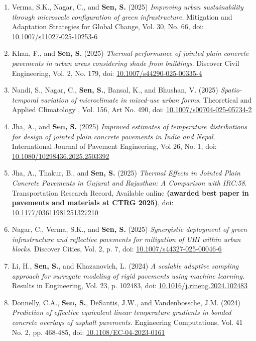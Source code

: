 \documentclass[12pt]{article}
\begin{document}
\begin{enumerate}
	\item Verma, S.K., Nagar, C., and \textbf{Sen, S.} (2025) \textit{Improving urban sustainability through microscale configuration of green infrastructure.} Mitigation and Adaptation Strategies for Global Change, Vol. 30, No. 66, doi: \href{https://doi.org/10.1007/s11027-025-10253-6}{10.1007/s11027-025-10253-6}
	\item Khan, F., and \textbf{Sen, S.} (2025) \textit{Thermal performance of jointed plain concrete pavements in urban areas considering shade from buildings}. Discover Civil Engineering, Vol. 2, No. 179, doi: \href{https://doi.org/10.1007/s44290-025-00335-4}{10.1007/s44290-025-00335-4}
	\item Nandi, S., Nagar, C., \textbf{Sen, S.}, Bansal, K., and Bhushan, V. (2025) \textit{Spatio-temporal variation of microclimate in mixed-use urban forms.} Theoretical and Applied Climatology , Vol. 156, Art No. 490,  doi: \href{https://doi.org/10.1007/s00704-025-05734-2}{10.1007/s00704-025-05734-2}
	\item Jha, A., and \textbf{Sen, S.} (2025) \textit{Improved estimates of temperature distributions for design of jointed plain concrete pavements in India and Nepal}. International Journal of Pavement Engineering, Vol 26, No. 1, doi: \href{https://doi.org/10.1080/10298436.2025.2503392}{10.1080/10298436.2025.2503392}
	\item Jha, A., Thakur, B., and \textbf{Sen, S.} (2025) \textit{Thermal Effects in Jointed Plain Concrete Pavements in Gujarat and Rajasthan: A Comparison with IRC:58}. Transportation Research Record, Available online \textbf{(awarded best paper in pavements and materials at CTRG 2025)}, doi: \href{https://doi.org/10.1177/03611981251327210}{10.1177/03611981251327210}
	\item Nagar, C., Verma, S.K., and \textbf{Sen, S.} (2025) \textit{Synergistic deployment of green infrastructure and reflective pavements for mitigation of UHI within urban blocks.} Discover Cities, Vol. 2, p. 7, doi: \href{https://doi.org/10.1007/s44327-025-00046-6}{10.1007/s44327-025-00046-6}
	\item Li, H., \textbf{Sen, S.}, and Khazanovich, L. (2024) \textit{A scalable adaptive sampling approach for surrogate modeling of rigid pavements using machine learning.} Results in Engineering, Vol. 23, p. 102483, doi: \href{https://doi.org/10.1016/j.rineng.2024.102483}{10.1016/j.rineng.2024.102483}
	\item Donnelly, C.A., \textbf{Sen, S.}, DeSantis, J.W., and Vandenbossche, J.M. (2024) \textit{Prediction of effective equivalent linear temperature gradients in bonded concrete overlays of asphalt pavements.}  Engineering Computations, Vol. 41 No. 2, pp. 468-485, doi: \href{https://doi.org/10.1108/EC-04-2023-0161}{10.1108/EC-04-2023-0161}

\end{enumerate}
\end{document}
